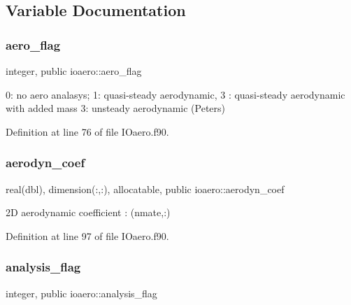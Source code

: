 \subsection{Variable Documentation}
\mbox{\label{namespaceioaero_afb280b6ca8de323c9a07076df81a71e1}} 
\subsubsection{\texorpdfstring{aero\+\_\+flag}{aero\_flag}}
{\footnotesize\ttfamily integer, public ioaero\+::aero\+\_\+flag}



0\+: no aero analasys; 1\+: quasi-\/steady aerodynamic, 3 \+: quasi-\/steady aerodynamic with added mass 3\+: unsteady aerodynamic (Peters) 



Definition at line 76 of file I\+Oaero.\+f90.

\mbox{\label{namespaceioaero_a116b30aa43f6d871e7d4a3ed6f4428c3}} 
\subsubsection{\texorpdfstring{aerodyn\+\_\+coef}{aerodyn\_coef}}
{\footnotesize\ttfamily real(dbl), dimension(\+:,\+:), allocatable, public ioaero\+::aerodyn\+\_\+coef}



2D aerodynamic coefficient \+: (nmate,\+:) 



Definition at line 97 of file I\+Oaero.\+f90.

\mbox{\label{namespaceioaero_a435527b09d62e7aac9883e1a6d6f3438}} 
\subsubsection{\texorpdfstring{analysis\+\_\+flag}{analysis\_flag}}
{\footnotesize\ttfamily integer, public ioaero\+::analysis\+\_\+flag}




